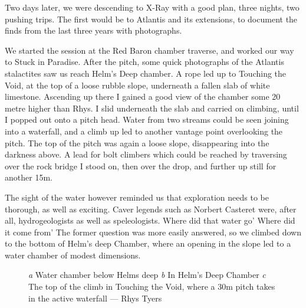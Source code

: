     Two days later, we were descending to X-Ray with a good plan, three nights, two pushing trips. The first would be to Atlantis and its extensions, to document the finds from the last three years with photographs. 

    We started the session at the Red Baron chamber traverse, and worked our way to Stuck in Paradise. After the pitch, some quick photographs of the Atlantis stalactites saw us reach Helm's Deep chamber. A rope led up to Touching the Void, at the top of a loose rubble slope, underneath a fallen slab of white limestone. Ascending up there I gained a good view of the chamber some 20 metre higher than Rhys. I slid underneath the slab and carried on climbing, until I popped out onto a pitch head. Water from two streams could be seen joining into a waterfall, and a climb up led to another vantage point overlooking the pitch. The top of the pitch was again a loose slope, disappearing into the darkness above. A lead for bolt climbers which could be reached by traversing over the rock bridge I stood on, then over the drop, and further up still for another 15m. 

    The sight of the water however reminded us that exploration needs to be thorough, as well as exciting. Caver legends such as Norbert Casteret were, after all, hydrogeologists as well as speleologists. Where did that water go' Where did it come from' The former question was more easily answered, so we climbed down to the bottom of Helm's deep Chamber, where an opening in the slope led to a water chamber of modest dimensions.

    \begin{figure}[t!]
        \checkoddpage \ifoddpage \forcerectofloat \else \forceversofloat \fi
        \centering
        \begin{subfigure}[t]{0.68\textwidth}
            \centering
            \caption{}\label{water chamber below helm's deep}
        \end{subfigure}
        \hfill
        \begin{subfigure}[t]{0.303\textwidth}
            \centering
            \caption{} \label{HelmsDeep}
        \end{subfigure}

        \vspace{0.3cm}
        
        \begin{subfigure}[t]{\textwidth}
            \centering
            \caption{} \label{Touching the Void}
        \end{subfigure}
        
        \caption{
            \emph{a} Water chamber below Helms deep
            \emph{b} In Helm's Deep Chamber
            \emph{c} The top of the climb in Touching the Void, where a 30m pitch takes in the active waterfall --- Rhys Tyers 
        }
    \end{figure}


